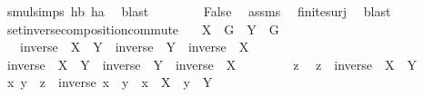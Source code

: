 \begin{isabellebody}
\ smul{\isachardot}{\kern0pt}simps\ hb\ ha\ \isamarkupfalse%
\ blast\isanewline
\ \ \isamarkupfalse%
\isanewline
\ \ \isamarkupfalse%
\ \isamarkupfalse%
\ False\ \isamarkupfalse%
\ assms\ \isamarkupfalse%
\ finite{\isacharunderscore}{\kern0pt}surj\ \isamarkupfalse%
\ blast\isanewline
{}\isamarkupfalse%
%
\endisatagproof
{\isafoldproof}%
%
\isadelimproof
%
\endisadelimproof
%
\isadelimdocument
%
\endisadelimdocument
%
\isatagdocument
%
\isamarkuptrue%
%
\endisatagdocument
{\isafolddocument}%
%
\isadelimdocument
%
\endisadelimdocument
{}\isamarkupfalse%
\ set{\isacharunderscore}{\kern0pt}inverse{\isacharunderscore}{\kern0pt}composition{\isacharunderscore}{\kern0pt}commute{\isacharcolon}{\kern0pt}\isanewline
\ \ \ {\isachardoublequoteopen}X\ {\isasymsubseteq}\ G{\isachardoublequoteclose}\ \ {\isachardoublequoteopen}Y\ {\isasymsubseteq}\ G{\isachardoublequoteclose}\isanewline
\ \ \ {\isachardoublequoteopen}inverse\ {\isacharbackquote}{\kern0pt}\ {\isacharparenleft}{\kern0pt}X\ {\isasymcdots}\ Y{\isacharparenright}{\kern0pt}\ {\isacharequal}{\kern0pt}\ {\isacharparenleft}{\kern0pt}inverse\ {\isacharbackquote}{\kern0pt}\ Y{\isacharparenright}{\kern0pt}\ {\isasymcdots}\ {\isacharparenleft}{\kern0pt}inverse\ {\isacharbackquote}{\kern0pt}\ X{\isacharparenright}{\kern0pt}{\isachardoublequoteclose}\isanewline
%
\isadelimproof
%
\endisadelimproof
%
\isatagproof
{}\isamarkupfalse%
\isanewline
\ \ \isamarkupfalse%
\ {\isachardoublequoteopen}inverse\ {\isacharbackquote}{\kern0pt}\ {\isacharparenleft}{\kern0pt}X\ {\isasymcdots}\ Y{\isacharparenright}{\kern0pt}\ {\isasymsubseteq}\ {\isacharparenleft}{\kern0pt}inverse\ {\isacharbackquote}{\kern0pt}\ Y{\isacharparenright}{\kern0pt}\ {\isasymcdots}\ {\isacharparenleft}{\kern0pt}inverse\ {\isacharbackquote}{\kern0pt}\ X{\isacharparenright}{\kern0pt}{\isachardoublequoteclose}\isanewline
\ \ \isamarkupfalse%
\isanewline
\ \ \ \ \isamarkupfalse%
\ z\ \isamarkupfalse%
\ {\isachardoublequoteopen}z\ {\isasymin}\ inverse\ {\isacharbackquote}{\kern0pt}\ {\isacharparenleft}{\kern0pt}X\ {\isasymcdots}\ Y{\isacharparenright}{\kern0pt}{\isachardoublequoteclose}\isanewline
\ \ \ \ \isamarkupfalse%
\ \isamarkupfalse%
\ x\ y\ \ {\isachardoublequoteopen}z\ {\isacharequal}{\kern0pt}\ inverse\ {\isacharparenleft}{\kern0pt}x\ {\isasymcdot}\ y{\isacharparenright}{\kern0pt}{\isachardoublequoteclose}\ \ {\isachardoublequoteopen}x\ {\isasymin}\ X{\isachardoublequoteclose}\ \ {\isachardoublequoteopen}y\ {\isasymin}\ Y{\isachardoublequoteclose}\ \isanewline

\end{isabellebody}

